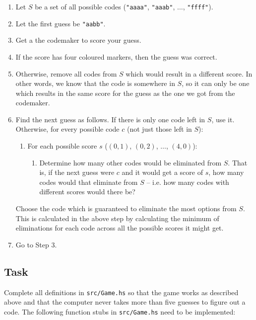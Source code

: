 \documentclass{cs256-shared/cs256}
\begin{document}
\begin{enumerate}
    \item Let $S$ be a set of all possible codes (\texttt{"aaaa"}, \texttt{"aaab"}, $\ldots$, \texttt{"ffff"}).
    \item Let the first guess be \texttt{"aabb"}.
    \item Get a the codemaker to score your guess.
    \item If the score has four coloured markers, then the guess was correct.
    \item Otherwise, remove all codes from $S$ which would result in a different score. In other words, we know that the code is somewhere in $S$, so it can only be one which results in the same score for the guess as the one we got from the codemaker. 
    \item Find the next guess as follows. If there is only one code left in $S$, use it. Otherwise, for every possible code $c$ (not just those left in $S$):
    \begin{enumerate}
        \item For each possible score $s$ ($(0,1)$, $(0,2)$, $\ldots$, $(4,0)$):
        \begin{enumerate}
            \item Determine how many other codes would be eliminated from $S$. That is, if the next guess were $c$ and it would get a score of $s$, how many codes would that eliminate from $S$ -- i.e. how many codes with different scores would there be?
        \end{enumerate}
    \end{enumerate}
    Choose the code which is guaranteed to eliminate the most options from $S$. This is calculated in the above step by calculating the minimum of eliminations for each code across all the possible scores it might get.
    \item Go to Step 3.
\end{enumerate}


\subsection*{Task}

Complete all definitions in \texttt{src/Game.hs} so that the game works as described above and that the computer never takes more than five guesses to figure out a code. The following function stubs in \texttt{src/Game.hs}  need to be implemented:
\end{document}
